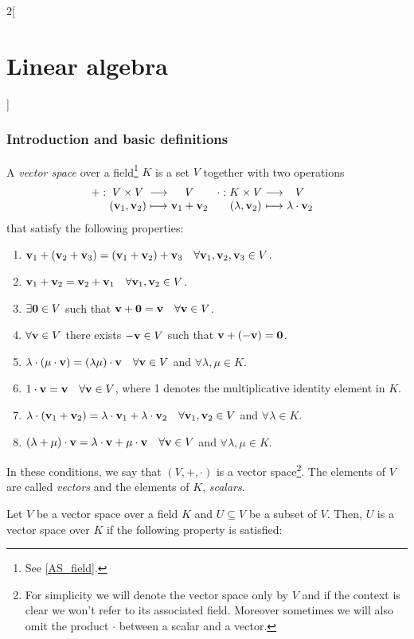 \documentclass[../../../main.tex]{subfiles}
\begin{document}
\begin{multicols}{2}[\section{Linear algebra}]
  \subsubsection{Introduction and basic definitions}
  \begin{definition}
    A \emph{vector space} over a field\footnote{See \cref{AS_field}.} $K$ is a set $V$ together with two operations
    \begin{align*}
      \function{+}{V\times V}{V}{(\vf{v}_1,\vf{v}_2)}{\vf{v}_1+ \vf{v}_2} & \function{\cdot}{K\times V}{V}{(\lambda,\vf{v}_2)}{\lambda\cdot\vf{v}_2}
    \end{align*}
    that satisfy the following properties:
    \begin{enumerate}
      \item $\boldsymbol{\mathrm{v}}_1+(\boldsymbol{\mathrm{v}}_2+\boldsymbol{\mathrm{v}}_3)=(\boldsymbol{\mathrm{v}}_1+\boldsymbol{\mathrm{v}}_2)+\boldsymbol{\mathrm{v}}_3\quad\forall\boldsymbol{\mathrm{v}}_1,\boldsymbol{\mathrm{v}}_2,\boldsymbol{\mathrm{v}}_3\in V$.
      \item $\boldsymbol{\mathrm{v}}_1+\boldsymbol{\mathrm{v}}_2=\boldsymbol{\mathrm{v}}_2+\boldsymbol{\mathrm{v}}_1\quad\forall\boldsymbol{\mathrm{v}}_1,\boldsymbol{\mathrm{v}}_2\in V$.
      \item $\exists\boldsymbol{\mathrm{0}}\in V$ such that $\boldsymbol{\mathrm{v}}+\boldsymbol{\mathrm{0}}=\boldsymbol{\mathrm{v}}\quad\forall\boldsymbol{\mathrm{v}}\in V$.
      \item $\forall\boldsymbol{\mathrm{v}}\in V$ there exists $-\boldsymbol{\mathrm{v}}\in V$ such that $\boldsymbol{\mathrm{v}}+(-\boldsymbol{\mathrm{v}})=\boldsymbol{\mathrm{0}}$.
      \item $\lambda\cdot(\mu\cdot\boldsymbol{\mathrm{v}})=(\lambda\mu)\cdot\boldsymbol{\mathrm{v}}\quad\forall\boldsymbol{\mathrm{v}}\in V$ and $\forall\lambda,\mu\in K$.
      \item $1\cdot\boldsymbol{\mathrm{v}}=\boldsymbol{\mathrm{v}}\quad\forall\boldsymbol{\mathrm{v}}\in V$, where 1 denotes the multiplicative identity element in $K$.
      \item $\lambda\cdot(\boldsymbol{\mathrm{v}}_1+\boldsymbol{\mathrm{v}}_2)=\lambda\cdot\boldsymbol{\mathrm{v}}_1+\lambda\cdot\boldsymbol{\mathrm{v}}_2\quad\forall\boldsymbol{\mathrm{v}}_1,\boldsymbol{\mathrm{v}}_2\in V$ and $\forall\lambda\in K$.
      \item $(\lambda+\mu)\cdot\boldsymbol{\mathrm{v}}=\lambda\cdot\boldsymbol{\mathrm{v}}+\mu\cdot\boldsymbol{\mathrm{v}}\quad\forall\boldsymbol{\mathrm{v}}\in V$ and $\forall\lambda,\mu\in K$.
    \end{enumerate}
    In these conditions, we say that $(V,+,\cdot)$ is a vector space\footnote{For simplicity we will denote the vector space only by $V$ and if the context is clear we won't refer to its associated field. Moreover sometimes we will also omit the product $\cdot$ between a scalar and a vector.}. The elements of $V$ are called \emph{vectors} and the elements of $K$, \emph{scalars}.
  \end{definition}
  \begin{definition}
    Let $V$ be a vector space over a field $K$ and $U\subseteq V$ be a subset of $V$. Then, $U$ is a vector space over $K$ if the following property is satisfied:

\end{definition}
\end{multicols}
\end{document}
